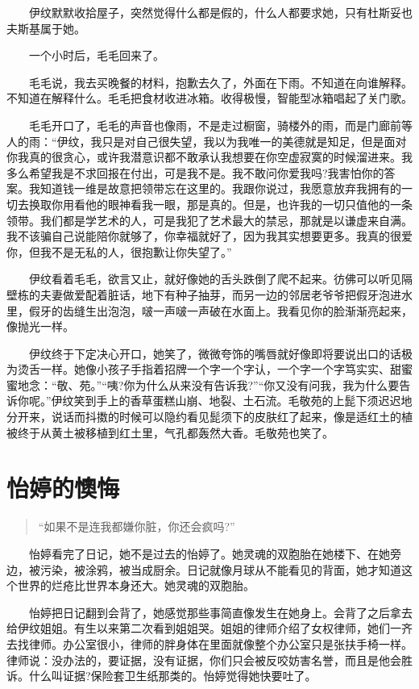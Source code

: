 \documentclass[12pt,UTF8]{ctexbook}
\begin{document}
　　伊纹默默收拾屋子，突然觉得什么都是假的，什么人都要求她，只有杜斯妥也夫斯基属于她。

　　一个小时后，毛毛回来了。

　　毛毛说，我去买晚餐的材料，抱歉去久了，外面在下雨。不知道在向谁解释。不知道在解释什么。毛毛把食材收进冰箱。收得极慢，智能型冰箱唱起了关门歌。

　　毛毛开口了，毛毛的声音也像雨，不是走过橱窗，骑楼外的雨，而是门廊前等人的雨：\enquote{伊纹，我只是对自己很失望，我以为我唯一的美德就是知足，但是面对你我真的很贪心，或许我潜意识都不敢承认我想要在你空虚寂寞的时候溜进来。我多么希望我是不求回报在付出，可是我不是。我不敢问你爱我吗?我害怕你的答案。我知道钱一维是故意把领带忘在这里的。我跟你说过，我愿意放弃我拥有的一切去换取你用看他的眼神看我一眼，那是真的。但是，也许我的一切只值他的一条领带。我们都是学艺术的人，可是我犯了艺术最大的禁忌，那就是以谦虚来自满。我不该骗自己说能陪你就够了，你幸福就好了，因为我其实想要更多。我真的很爱你，但我不是无私的人，很抱歉让你失望了。}

　　伊纹看着毛毛，欲言又止，就好像她的舌头跌倒了爬不起来。彷佛可以听见隔壁栋的夫妻做爱配着脏话，地下有种子抽芽，而另一边的邻居老爷爷把假牙泡进水里，假牙的齿缝生出泡泡，啵一声啵一声破在水面上。我看见你的脸渐渐亮起来，像抛光一样。

　　伊纹终于下定决心开口，她笑了，微微夸饰的嘴唇就好像即将要说出口的话极为烫舌一样。她像小孩子手指着招牌一个字一个字认，一个字一个字笃实实、甜蜜蜜地念：\enquote{敬、苑。}\enquote{咦?你为什么从来没有告诉我?}\enquote{你又没有问我，我为什么要告诉你呢。}伊纹笑到手上的香草蛋糕山崩、地裂、土石流。毛敬苑的上髭下须迟迟地分开来，说话而抖擞的时候可以隐约看见髭须下的皮肤红了起来，像是适红土的植被终于从黄土被移植到红土里，气孔都轰然大香。毛敬苑也笑了。

\hypertarget{ux6021ux5a77ux7684ux61caux6094}{%
\section*{怡婷的懊悔}\label{ux6021ux5a77ux7684ux61caux6094}}

\begin{quote}
\enquote{如果不是连我都嫌你脏，你还会疯吗?}
\end{quote}

　　怡婷看完了日记，她不是过去的怡婷了。她灵魂的双胞胎在她楼下、在她旁边，被污染，被涂鸦，被当成厨余。日记就像月球从不能看见的背面，她才知道这个世界的烂疮比世界本身还大。她灵魂的双胞胎。

　　怡婷把日记翻到会背了，她感觉那些事简直像发生在她身上。会背了之后拿去给伊纹姐姐。有生以来第二次看到姐姐哭。姐姐的律师介绍了女权律师，她们一齐去找律师。办公室很小，律师的胖身体在里面就像整个办公室只是张扶手椅一样。律师说：没办法的，要证据，没有证据，你们只会被反咬妨害名誉，而且是他会胜诉。什么叫证据?保险套卫生纸那类的。怡婷觉得她快要吐了。
\end{document}
